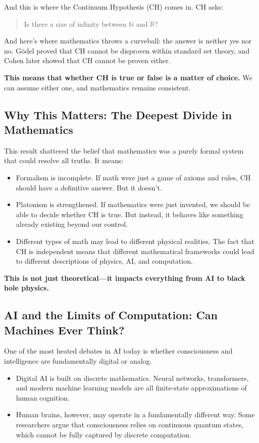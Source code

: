 And this is where the Continuum Hypothesis (CH) comes in. CH asks: 

\begin{quote}
Is there a size of infinity between \( \mathbb{N} \) and \( \mathbb{R} \)?
\end{quote}

And here’s where mathematics throws a curveball: the answer is neither yes nor no. Gödel proved that CH cannot be disproven within standard set theory, and Cohen later showed that CH cannot be proven either. 

\textbf{This means that whether CH is true or false is a matter of choice.} We can assume either one, and mathematics remains consistent.

\subsection{Why This Matters: The Deepest Divide in Mathematics}

This result shattered the belief that mathematics was a purely formal system that could resolve all truths. It means:

\begin{itemize}
    \item Formalism is incomplete. If math were just a game of axioms and rules, CH should have a definitive answer. But it doesn’t.
    \item Platonism is strengthened. If mathematics were just invented, we should be able to decide whether CH is true. But instead, it behaves like something already existing beyond our control.
    \item Different types of math may lead to different physical realities. The fact that CH is independent means that different mathematical frameworks could lead to different descriptions of physics, AI, and computation.
\end{itemize}

\textbf{This is not just theoretical—it impacts everything from AI to black hole physics.}

\subsection{AI and the Limits of Computation: Can Machines Ever Think?}

One of the most heated debates in AI today is whether consciousness and intelligence are fundamentally digital or analog.

\begin{itemize}
    \item Digital AI is built on discrete mathematics. Neural networks, transformers, and modern machine learning models are all finite-state approximations of human cognition.
    \item Human brains, however, may operate in a fundamentally different way. Some researchers argue that consciousness relies on continuous quantum states, which cannot be fully captured by discrete computation.
\end{itemize}

